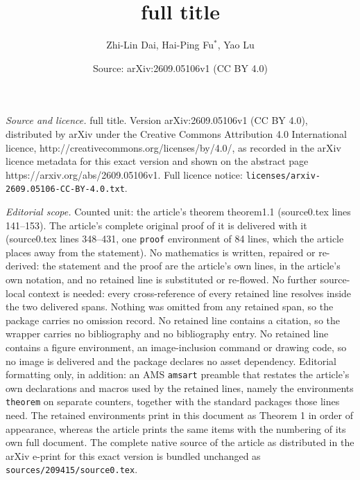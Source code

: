 \documentclass[10pt,a4paper]{amsart}
\title{full title}
\author{Zhi-Lin Dai, Hai-Ping Fu$^*$, Yao Lu}
\date{Source: arXiv:2609.05106v1 (CC BY 4.0)}
\begin{document}
\maketitle

\noindent\emph{Source and licence.} full title. Version arXiv:2609.05106v1 (CC BY 4.0), distributed by arXiv under the Creative Commons Attribution 4.0 International licence, http://creativecommons.org/licenses/by/4.0/, as recorded in the arXiv licence metadata for this exact version and shown on the abstract page https://arxiv.org/abs/2609.05106v1. Full licence notice: \texttt{licenses/arxiv-2609.05106-CC-BY-4.0.txt}.\par\smallskip

\noindent\textit{Editorial scope.} Counted unit: the article's theorem theorem1.1 (source0.tex lines 141--153). The article's complete original proof of it is delivered with it (source0.tex lines 348--431, one \texttt{proof} environment of 84 lines, which the article places away from the statement). No mathematics is written, repaired or re-derived: the statement and the proof are the article's own lines, in the article's own notation, and no retained line is substituted or re-flowed.  No further source-local context is needed: every cross-reference of every retained line resolves inside the two delivered spans.  Nothing was omitted from any retained span, so the package carries no omission record.  No retained line contains a citation, so the wrapper carries no bibliography and no bibliography entry.  No retained line contains a figure environment, an image-inclusion command or drawing code, so no image is delivered and the package declares no asset dependency.  Editorial formatting only, in addition: an AMS \texttt{amsart} preamble that restates the article's own declarations and macros used by the retained lines, namely the environments \texttt{theorem} on separate counters, together with the standard packages those lines need.  The retained environments print in this document as Theorem 1 in order of appearance, whereas the article prints the same items with the numbering of its own full document.  The complete native source of the article as distributed in the arXiv e-print for this exact version is bundled unchanged as \texttt{sources/209415/source0.tex}.
\end{document}
